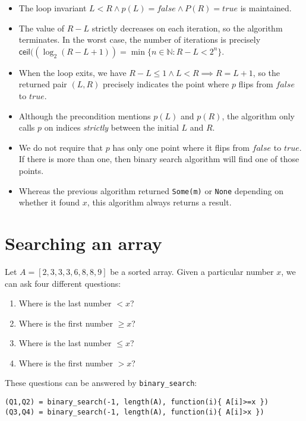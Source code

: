 \documentclass[a4paper, 11pt]{article}
\begin{document}
\begin{itemize}
  \item The loop invariant $L<R \wedge p(L)=false \wedge P(R)=true$ is maintained.
  \item The value of $R - L$ strictly decreases on each iteration, so the algorithm terminates. In the worst case, the number of iterations is precisely $\mathsf{ceil}((\log_2(R - L + 1)) = \min \{n\in \mathbb{N} : R - L < 2^n\}$.
  \item When the loop exits, we have $R - L \leq 1 \wedge L < R \implies R = L+1$, so the returned pair $(L,R)$ precisely indicates the point where $p$ flips from $false$ to $true$.
  \item Although the precondition mentions $p(L)$ and $p(R)$, the algorithm only calls $p$ on indices \emph{strictly} between the initial $L$ and $R$.
  \item We do not require that $p$ has only one point where it flips from $false$ to $true$. If there is more than one, then binary search algorithm will find one of those points.
  \item Whereas the previous algorithm returned \lstinline|Some(m)| or \lstinline|None| depending on whether it found $x$, this algorithm always returns a result.
\end{itemize}

\section{Searching an array}

Let $A = [2,3,3,3,6,8,8,9]$ be a sorted array. Given a particular number $x$, we can ask four different questions:

\begin{enumerate}[(Q1)]
  \item Where is the last number $<x$?
  \item Where is the first number $\geq x$?
  \item Where is the last number $\leq x$?
  \item Where is the first number $>x$?
\end{enumerate}

\noindent These questions can be answered by \lstinline|binary_search|:

\begin{lstlisting}
(Q1,Q2) = binary_search(-1, length(A), function(i){ A[i]>=x })
(Q3,Q4) = binary_search(-1, length(A), function(i){ A[i]>x })
\end{lstlisting}
\end{document}
